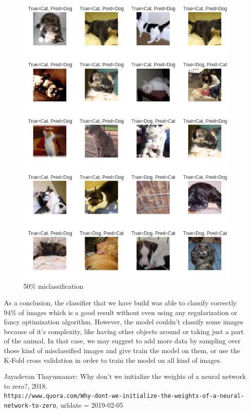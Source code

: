\documentclass[a4paper]{article}
\begin{document}
\begin{itemize}
\begin{figure}[h!]
	\centering
	\includegraphics[scale=.4]{50misclass.png}
	\caption{50\% miclassification}
		\label{fig:50misclass}
	\end{figure}


\end{itemize}

As a conclusion, the classifier that we have build was able to classify correctly $94\%$ of images which is a good result without even using any regularization or fancy optimization algorithm. However, the model couldn't classify some images because of it's complexity, like having other objects around or taking just a part of the animal. In that case, we may suggest to add more data by sampling over those kind of misclassified images and give train the model on them, or use the K-Fold cross validation in order to train the model on all kind of images.
 
 \newpage
\begin{thebibliography}{9}
  Jayadevan Thayumanav: Why don't we initialize the weights of a neural network to zero?, 2018.
  \\\texttt{https://www.quora.com/Why-dont-we-initialize-the-weights-of-a-neural-network-to-zero}, urldate = {2019-02-05}
\end{thebibliography}
\end{document}
